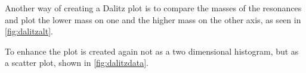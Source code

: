 Another way of creating a Dalitz plot is to compare the masses of the resonances and plot the lower mass on one and the higher mass on the other axis, as seen in \autoref{fig:dalitzalt}.


To enhance the plot is created again not as a two dimensional histogram, but as a scatter plot, shown in \autoref{fig:dalitzdata}.


